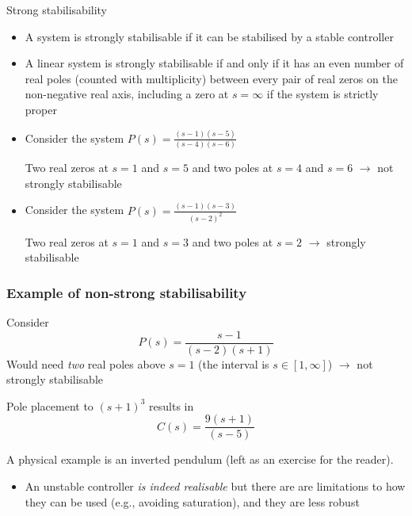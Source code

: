 \documentclass[10pt]{beamer-control}
\begin{document}
\begin{frame}{Strong stabilisability}
  \begin{itemize}
    \item A system is strongly stabilisable if it can be stabilised by a stable controller
    \item A linear system is strongly stabilisable if and only if it has an even number of real poles (counted with multiplicity) between every pair of real zeros on the non-negative real axis, including a zero at $s=\infty$ if the system is strictly proper
    \item Consider the system
      \begin{math}
        P(s) = \frac{(s-1)(s-5)}{(s-4)(s-6)}
      \end{math}
      
      Two real zeros at $s=1$ and $s=5$ and two poles at $s=4$ and $s=6$  $\rightarrow$ not strongly stabilisable
    \item Consider the system
      \begin{math}
        P(s) = \frac{(s-1)(s-3)}{(s-2)^2}
      \end{math}
      
      Two real zeros at $s=1$ and $s=3$ and two poles at $s=2$ $\rightarrow$ strongly stabilisable
  \end{itemize}
\end{frame}

\begin{frame}
\frametitle{Example of non-strong stabilisability}

Consider
\begin{equation}
P(s) = \frac{s-1}{(s-2)(s+1)}
\end{equation}
Would need \emph{two} real poles above $s=1$ (the interval is $s\in[1,\infty]$) $\rightarrow$ not strongly stabilisable

Pole placement to $(s+1)^3$ results in
\begin{equation}
C(s) = \frac{9(s+1)}{(s-5)}
\end{equation}

A physical example is an inverted pendulum (left as an exercise for the reader). 

\begin{itemize}
\item
An unstable controller \emph{is indeed realisable} but there are are limitations to how they can be used (e.g., avoiding saturation), and they are less robust
\end{itemize}

\end{frame}
\end{document}
